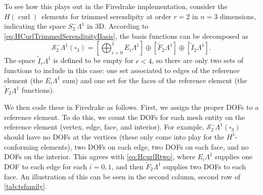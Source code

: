 \documentclass[format=acmsmall,screen,timestamp=false,a4paper]{acmart}
\DeclareMathOperator{\curl}{curl}
\newcommand\josh[1]{\textbf{\textcolor[rgb]{0,.5,1}{[Josh: #1]}}}
\newcommand\lm[1]{\textbf{\textcolor[rgb]{1,0,0.5}{[Lawrence: #1]}}}
\newcommand{\calS}{\mathcal{S}}
\newcommand{\hcurl}{\ensuremath{{H}(\curl)}\xspace}
\begin{document}
 
To see how this plays out in the Firedrake implementation, consider the \hcurl~elements for trimmed serendipity at order $r=2$ in $n=3$ dimensions, indicating the space $S_2^- \Lambda^1$ in 3D. According to \cref{eq:HCurlTrimmedSerendipityBasis}, the basis functions can be decomposed as
\begin{equation}\label{eq:HcurlRtwo}
   \calS^-_2\Lambda^1(\square_3) =    \left[\bigoplus_{i=0}^{1} E_i \Lambda^1\right] \oplus \left[\tilde{F}_2 \Lambda^1\right]\oplus \left[\tilde{I}_2 \Lambda^1\right].
   \end{equation}
The space $\tilde{I}_r \Lambda^1$ is defined to be empty for $r<4$, so there are only two sets of functions to include in this case: one set associated to edges of the reference element (the $E_i\Lambda^1$ sum) and one set for the faces of the reference element (the $\tilde{F}_2\Lambda^1$ functions).

We then code these in Firedrake as follows.  First, we assign the proper DOFs to a reference element.  To do this, we count the DOFs for each mesh entity on the reference element (vertex, edge, face, and interior).  For example, $\mathcal{S}_2^- \Lambda^1(\square_3)$ should have no DOFs at the vertices (these only come into play for the $H^1$-conforming elements), two DOFs on each edge, two DOFs on each face, and no DOFs on the interior.  This agrees with \cref{eq:HcurlRtwo}, where $E_i\Lambda^1$ supplies one DOF to each edge for each $i=0, 1$, and then $\tilde{F}_2\Lambda^1$ supplies two DOFs to each face.  An illustration of this can be seen in the second column, second row of \cref{tab:tsfamily}.
\end{document}
